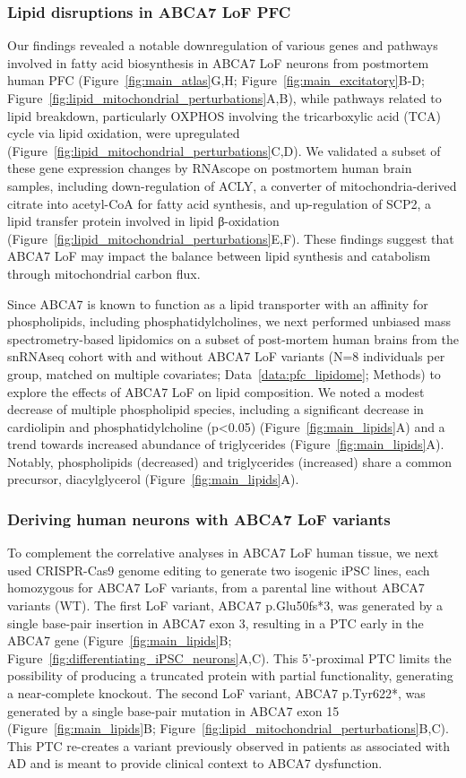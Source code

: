 \subsubsection{Lipid disruptions in ABCA7 LoF PFC}
Our findings revealed a notable downregulation of various genes and pathways involved in fatty acid biosynthesis in ABCA7 LoF neurons from postmortem human PFC (Figure~\ref{fig:main_atlas}G,H; Figure~\ref{fig:main_excitatory}B-D; Figure~\ref{fig:lipid_mitochondrial_perturbations}A,B), while pathways related to lipid breakdown, particularly OXPHOS involving the tricarboxylic acid (TCA) cycle via lipid oxidation, were upregulated (Figure~\ref{fig:lipid_mitochondrial_perturbations}C,D). We validated a subset of these gene expression changes by RNAscope on postmortem human brain samples, including down-regulation of ACLY, a converter of mitochondria-derived citrate into acetyl-CoA for fatty acid synthesis, and up-regulation of SCP2, a lipid transfer protein involved in lipid β-oxidation (Figure~\ref{fig:lipid_mitochondrial_perturbations}E,F). These findings suggest that ABCA7 LoF may impact the balance between lipid synthesis and catabolism through mitochondrial carbon flux.

Since ABCA7 is known to function as a lipid transporter with an affinity for phospholipids, including phosphatidylcholines\cite{Tomioka2017-nv,Picataggi2022-yp}, we next performed unbiased mass spectrometry-based lipidomics on a subset of post-mortem human brains from the snRNAseq cohort with and without ABCA7 LoF variants (N=8 individuals per group, matched on multiple covariates; Data~\ref{data:pfc_lipidome}; Methods) to explore the effects of ABCA7 LoF on lipid composition. We noted a modest decrease of multiple phospholipid species, including a significant decrease in cardiolipin and phosphatidylcholine (p<0.05) (Figure~\ref{fig:main_lipids}A) and a trend towards increased  abundance of triglycerides (Figure~\ref{fig:main_lipids}A). Notably, phospholipids (decreased) and triglycerides (increased) share a common precursor, diacylglycerol (Figure~\ref{fig:main_lipids}A). 

\subsubsection{Deriving human neurons with ABCA7 LoF variants}
To complement the correlative analyses in ABCA7 LoF human tissue, we next used CRISPR-Cas9 genome editing to generate two isogenic iPSC lines, each homozygous for ABCA7 LoF variants, from a parental line without ABCA7 variants (WT). The first LoF variant, ABCA7 p.Glu50fs*3, was generated by a single base-pair insertion in ABCA7 exon 3, resulting in a PTC early in the ABCA7 gene (Figure~\ref{fig:main_lipids}B; Figure~\ref{fig:differentiating_iPSC_neurons}A,C). This 5’-proximal PTC limits the possibility of producing a truncated protein with partial functionality, generating a near-complete knockout. The second LoF variant, ABCA7 p.Tyr622*, was generated by a single base-pair mutation in ABCA7 exon 15 (Figure~\ref{fig:main_lipids}B; Figure~\ref{fig:lipid_mitochondrial_perturbations}B,C). This PTC re-creates a variant previously observed in patients as associated with AD \cite{Steinberg2015-mu} and is meant to provide clinical context to ABCA7 dysfunction. 

